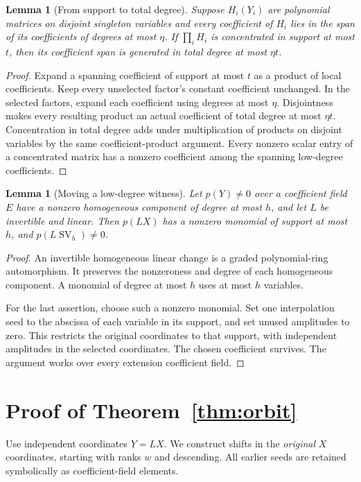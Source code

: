\documentclass[11pt]{article}
\newtheorem{lemma}[theorem]{Lemma}
\newcommand{\SV}{\operatorname{SV}}
\begin{document}
\begin{lemma}[From support to total degree]\label{lem:degree}
Suppose $H_i(Y_i)$ are polynomial matrices on disjoint singleton
variables and every coefficient of $H_i$ lies in the span of its
coefficients of degrees at most $\eta$. If $\prod_iH_i$ is concentrated
in support at most $t$, then its coefficient span is generated in
total degree at most $\eta t$.
\end{lemma}
\begin{proof}
Expand a spanning coefficient of support at most $t$ as a product of
local coefficients. Keep every unselected factor's constant coefficient
unchanged. In the selected factors, expand each coefficient using
degrees at most $\eta$. Disjointness makes every resulting product an
actual coefficient of total degree at most $\eta t$.
Concentration in total degree adds under multiplication of products on
disjoint variables by the same coefficient-product argument.
Every nonzero scalar entry of a concentrated matrix has a nonzero
coefficient among the spanning low-degree coefficients.
\end{proof}

\begin{lemma}[Moving a low-degree witness]\label{lem:move}
Let $p(Y)\ne0$ over a coefficient field $E$ have a nonzero homogeneous
component of degree at most $h$, and let $L$ be invertible and linear.
Then $p(LX)$ has a nonzero monomial of support at most $h$, and
$p(L\SV_h)\ne0$.
\end{lemma}
\begin{proof}
An invertible homogeneous linear change is a graded polynomial-ring
automorphism. It preserves the nonzeroness and degree of each
homogeneous component. A monomial of degree at most $h$ uses at most
$h$ variables.

For the last assertion, choose such a nonzero monomial. Set one
interpolation seed to the abscissa of each variable in its support,
and set unused amplitudes to zero. This restricts the original
coordinates to that support, with independent amplitudes in the
selected coordinates. The chosen coefficient survives. The argument
works over every extension coefficient field.
\end{proof}

\section{Proof of Theorem~\ref{thm:orbit}}

Use independent coordinates $Y=LX$. We construct shifts in the
\emph{original} $X$ coordinates, starting with ranks $w$ and descending.
All earlier seeds are retained symbolically as coefficient-field
elements.
\end{document}
